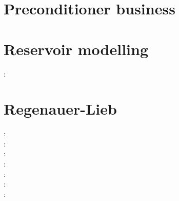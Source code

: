 \section{Preconditioner business}

\begin{scriptsize}
\cite{benz02}
\cite{bewa08}
\cite{urvs08}
\end{scriptsize}

\section{Reservoir modelling}

\begin{scriptsize}
\twothousandthirteen: \textcite{orwa13}
\end{scriptsize}

\section{Regenauer-Lieb}

{\scriptsize
\twothousand: \cite{reyu98}\\
\twothousand: \cite{reyu00}\\
\twothousandthree: \cite{reyu03}\\
\twothousandfour: \cite{reyu04}\\
\twothousandsix: \cite{rehy06}\cite{rewr06}\\
\twothousandnine: \cite{reps09}\\
\twothousandthirteen: \cite{revp13}
}

